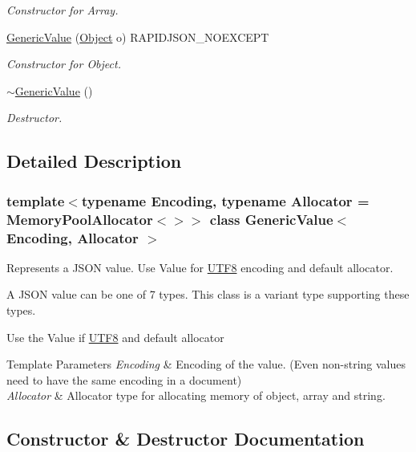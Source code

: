 \begin{DoxyCompactItemize}
\begin{DoxyCompactList}\small\item\em Constructor for Array. \end{DoxyCompactList}\item 
\hyperlink{a01992_a9c294e56f4ab940f845f7c171b183483}{Generic\+Value} (\hyperlink{a02080}{Object} o) R\+A\+P\+I\+D\+J\+S\+O\+N\+\_\+\+N\+O\+E\+X\+C\+E\+PT
\begin{DoxyCompactList}\small\item\em Constructor for Object. \end{DoxyCompactList}\item 
\hyperlink{a01992_a213ba89ef5ef961a5e655bd8c78ac9f4}{$\sim$\+Generic\+Value} ()
\begin{DoxyCompactList}\small\item\em Destructor. \end{DoxyCompactList}\end{DoxyCompactItemize}


\subsection{Detailed Description}
\subsubsection*{template$<$typename Encoding, typename Allocator = Memory\+Pool\+Allocator$<$$>$$>$\newline
class Generic\+Value$<$ Encoding, Allocator $>$}

Represents a J\+S\+ON value. Use Value for \hyperlink{a02144}{U\+T\+F8} encoding and default allocator. 

A J\+S\+ON value can be one of 7 types. This class is a variant type supporting these types.

Use the Value if \hyperlink{a02144}{U\+T\+F8} and default allocator


\begin{DoxyTemplParams}{Template Parameters}
{\em Encoding} & Encoding of the value. (Even non-\/string values need to have the same encoding in a document) \\
\hline
{\em Allocator} & Allocator type for allocating memory of object, array and string. \\
\hline
\end{DoxyTemplParams}


\subsection{Constructor \& Destructor Documentation}
\mbox{\label{a01992_a83c8f84b8e61f2f40414b703b75aea61}} 

